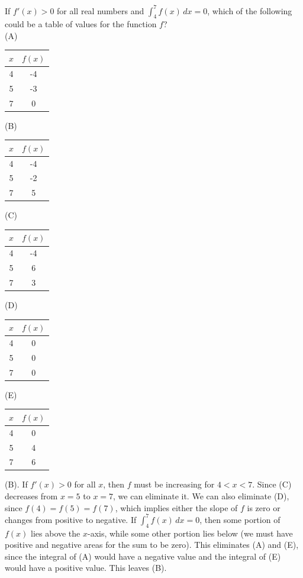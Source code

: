 \begin{Exercise} If $f'(x) > 0$ for all real 
numbers and $\int_4^7 f(x)\,dx = 0$, which of the following could be a table 
of values for the function $f$?\\
(A) \begin{tabular}{|c|c|}\hline
$x$ & $f(x)$\\\hline
4 & -4\\\hline
5 & -3\\\hline
7 & 0\\\hline
\end{tabular}
(B)\begin{tabular}{|c|c|}\hline
$x$ & $f(x)$\\\hline
4 & -4\\\hline
5 & -2\\\hline
7 & 5\\\hline
\end{tabular}
(C)\begin{tabular}{|c|c|}\hline
$x$ & $f(x)$\\\hline
4 & -4\\\hline
5 & 6\\\hline
7 & 3\\\hline
\end{tabular}
(D)\begin{tabular}{|c|c|}\hline
$x$ & $f(x)$\\\hline
4 & 0\\\hline
5 & 0\\\hline
7 & 0\\\hline
\end{tabular}
(E)\begin{tabular}{|c|c|}\hline
$x$ & $f(x)$\\\hline
4 & 0\\\hline
5 & 4\\\hline
7 & 6\\\hline
\end{tabular}
\end{Exercise}

\begin{Answer}[ref = defint5]
(B). If $f'(x) > 0$ for all $x$, then $f$ must be increasing for $4 < x < 7$. 
Since (C) decreases from $x = 5$ to $x = 7$, we can eliminate it. We can also 
eliminate (D), since $f(4) = f(5) = f(7)$, which implies either the slope of 
$f$ is zero or changes from positive to negative. If $\int_4^7 f(x)\,dx = 0$, 
then some portion of $f(x)$ lies above the $x$-axis, while some other portion 
lies below (we must have positive and negative areas for the sum to be zero). 
This eliminates (A) and (E), since the integral of (A) would have a negative 
value and the integral of (E) would have a positive value. This leaves (B). 
\end{Answer}


